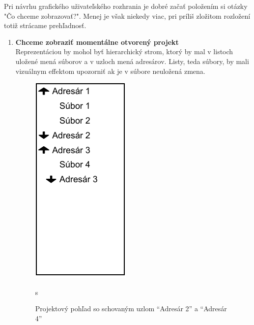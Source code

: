Pri návrhu grafického uživateľského rozhrania je dobré začať položením si otázky "Čo chceme zobrazovať?". Menej je však niekedy viac, pri príliš zložitom rozložení totiž strácame prehľadnosť. \\

\begin{enumerate}
	\item \textbf{Chceme zobraziť momentálne otvorený projekt} \\
	Reprezentáciou by mohol byť hierarchický strom, ktorý by mal v listoch uložené mená súborov a v uzloch mená adresárov. Listy, teda súbory, by mali vizuálnym effektom upozorniť ak je v súbore neuložená zmena. \\
	
	\begin{figure}[H]
		\centering
		\begin{minipage}{.4\textwidth}
			\centering
			\includegraphics[scale=0.75]{obrazky-figures/UI-project-pane}
			\caption{ Projektový pohľad so schovaným uzlom ``Adresár 2'' a ``Adresár 4''}s
		\end{minipage}
		\begin{minipage}{.05\textheight} %
			\quad
		\end{minipage}
		\begin{minipage}{.4\textwidth}
			\centering

\end{minipage}
\end{figure}
\end{enumerate}
